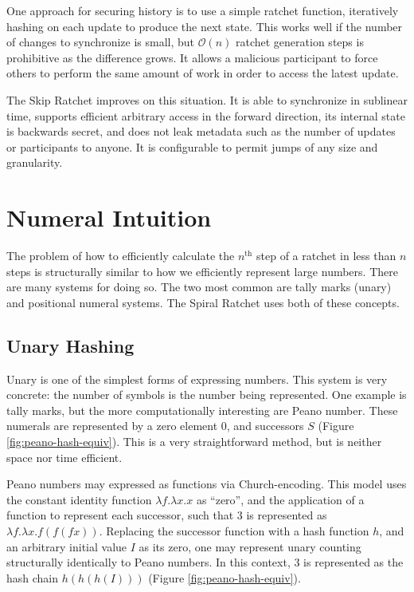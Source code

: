 \documentclass{article}
\begin{document}
    One approach for securing history is to use a simple ratchet function, iteratively hashing on each update to produce the next state. This works well if the number of changes to synchronize is small, but $\mathcal{O}(n)$ ratchet generation steps is prohibitive as the difference grows. It allows a malicious participant to force others to perform the same amount of work in order to access the latest update.
    
    The Skip Ratchet improves on this situation. It is able to synchronize in sublinear time, supports efficient arbitrary access in the forward direction, its internal state is backwards secret, and does not leak metadata such as the number of updates or participants to anyone. It is configurable to permit jumps of any size and granularity.
    
    \section{Numeral Intuition}
    
    The problem of how to efficiently calculate the $n^{\text{th}}$ step of a ratchet in less than $n$ steps is structurally similar to how we efficiently represent large numbers. There are many systems for doing so. The two most common are tally marks (unary) and positional numeral systems. The Spiral Ratchet uses both of these concepts.
    
	\subsection{Unary Hashing}

	Unary is one of the simplest forms of expressing numbers. This system is very concrete: the number of symbols is the number being represented. One example is tally marks, but the more computationally interesting are Peano number\cite{peano-wikipedia}. These numerals are represented by a zero element 0, and successors $S$ (Figure \ref{fig:peano-hash-equiv}). This is a very straightforward method, but is neither space nor time efficient.

	Peano numbers may expressed as functions via Church-encoding\cite{tapl-church-numerals}. This model uses the constant identity function $\lambda{f}.\lambda{x}.x$ as ``zero'', and the application of a function to represent each successor, such that 3 is represented as $\lambda{f}.\lambda{x}.f(f(f x))$. Replacing the successor function with a hash function $h$, and an arbitrary initial value $I$ as its zero, one may represent unary counting structurally identically to Peano numbers. In this context, 3 is represented as the hash chain $h(h(h(I)))$ (Figure \ref{fig:peano-hash-equiv}).
	
\end{document}
